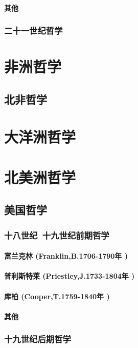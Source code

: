 \documentclass[UTF8]{../RepresentationUniverse}
\begin{document}
    \paragraph{其他}
\subsubsection{二十一世纪哲学}


\section{非洲哲学}
\subsection{北非哲学}


\section{大洋洲哲学}

\section{北美洲哲学}
\subsection{美国哲学}
\subsubsection{十八世纪~十九世纪前期哲学}
    \paragraph{富兰克林 (Franklin,B.1706-1790年 )}
    \paragraph{普利斯特莱 (Priestley,J.1733-1804年 )}
    \paragraph{库柏 (Cooper,T.1759-1840年 )}
    \paragraph{其他}
\subsubsection{十九世纪后期哲学}
\end{document}
